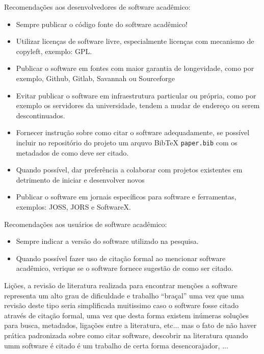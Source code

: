 Recomendações aos desenvolvedores de software acadêmico:

\begin{itemize}
  \item Sempre publicar o código fonte do software acadêmico!
  \item Utilizar licenças de software livre, especialmente licenças com mecanismo de copyleft, exemplo: GPL.
  \item Publicar o software em fontes com maior garantia de longevidade, como por exemplo, Github, Gitlab, Savannah ou Sourceforge
  \item Evitar publicar o software em infraestrutura particular ou própria, como por exemplo os servidores da universidade, tendem a mudar de endereço ou serem descontinuados.
  \item Fornecer instrução sobre como citar o software adequadamente, se possível incluir no repositório do projeto um arquvo BibTeX \texttt{paper.bib} com os metadados de como deve ser citado.
  \item Quando possível, dar preferência a colaborar com projetos existentes em detrimento de iniciar e desenvolver novos
  \item Publicar o software em jornais específicos para software e ferramentas, exemplos: JOSS, JORS e SoftwareX.
\end{itemize}

Recomendações aos usuários de software acadêmico:

\begin{itemize}
  \item Sempre indicar a versão do software utilizado na pesquisa.
  \item Quando possível fazer uso de citação formal ao mencionar software acadêmico, verique se o software fornece sugestão de como ser citado.
\end{itemize}

Lições, a revisão de literatura realizada para encontrar menções a software
representa um alto grau de dificuldade e trabalho ``braçal'' uma vez que uma
revisão deste tipo seria simplificada muitissimo caso o software fosse citado
através de citação formal, uma vez que desta forma existem inúmeras soluções para
busca, metadados, ligações entre a literatura, etc... mas o fato de não haver
prática padronizada sobre como citar software, descobrir na literatura quando
umm software é citado é um trabalho de certa forma desencorajador, ...

